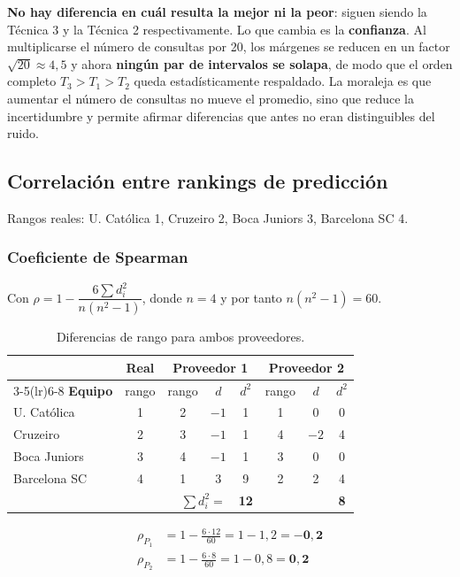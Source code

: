 \documentclass[11pt, a4paper]{article}
\begin{document}
\textbf{No hay diferencia en cuál resulta la mejor ni la peor}: siguen siendo la Técnica 3 y la
Técnica 2 respectivamente. Lo que cambia es la \textbf{confianza}. Al multiplicarse el número de
consultas por 20, los márgenes se reducen en un factor $\sqrt{20} \approx 4{,}5$ y ahora
\textbf{ningún par de intervalos se solapa}, de modo que el orden completo
$T_3 > T_1 > T_2$ queda estadísticamente respaldado. La moraleja es que aumentar el número de
consultas no mueve el promedio, sino que reduce la incertidumbre y permite afirmar diferencias que
antes no eran distinguibles del ruido.

\subsection{Correlación entre rankings de predicción}

Rangos reales: U. Católica 1, Cruzeiro 2, Boca Juniors 3, Barcelona SC 4.

\subsubsection{Coeficiente de Spearman}

Con $\rho = 1 - \dfrac{6\sum d_i^2}{n(n^2-1)}$, donde $n = 4$ y por tanto $n(n^2-1) = 60$.

\begin{table}[H]
\centering
\caption{Diferencias de rango para ambos proveedores.}
\small
\renewcommand{\arraystretch}{1.2}
\begin{tabular}{@{}lccccccc@{}}
\toprule
& \textbf{Real} & \multicolumn{3}{c}{\textbf{Proveedor 1}} & \multicolumn{3}{c}{\textbf{Proveedor 2}} \\
\cmidrule(lr){3-5}\cmidrule(lr){6-8}
\textbf{Equipo} & rango & rango & $d$ & $d^2$ & rango & $d$ & $d^2$ \\
\midrule
U. Católica  & 1 & 2 & $-1$ & 1 & 1 & 0  & 0 \\
Cruzeiro     & 2 & 3 & $-1$ & 1 & 4 & $-2$ & 4 \\
Boca Juniors & 3 & 4 & $-1$ & 1 & 3 & 0  & 0 \\
Barcelona SC & 4 & 1 & 3    & 9 & 2 & 2  & 4 \\
\midrule
\multicolumn{4}{r}{$\sum d_i^2 =$} & \textbf{12} & & & \textbf{8} \\
\bottomrule
\end{tabular}
\end{table}

\begin{align}
\rho_{P_1} &= 1 - \frac{6 \cdot 12}{60} = 1 - 1{,}2 = \mathbf{-0{,}2} \\
\rho_{P_2} &= 1 - \frac{6 \cdot 8}{60} = 1 - 0{,}8 = \mathbf{0{,}2}
\end{align}
\end{document}
